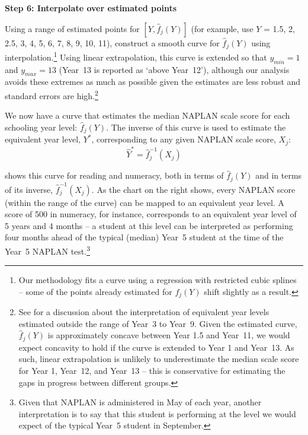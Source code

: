 \vspace{9pt}
\textbf{Step 6: Interpolate over estimated points}
\nopagebreak

Using a range of estimated points for $\left[Y,\widehat{f}_{j}(Y)\right]$ (for example, use $Y$ = 1.5, 2, 2.5, 3, 4, 5, 6, 7, 8, 9, 10, 11), construct a smooth curve for $\widehat{f}_{j}(Y)$ using interpolation.\footnote{Our methodology fits a curve using a regression with restricted cubic splines -- some of the points already estimated for $f_{j}(Y)$ shift slightly as a result.} Using linear extrapolation, this curve is extended so that $y_{min} = 1$ and $y_{max} = 13$ (\mbox{Year 13} is reported as `above \mbox{Year 12}'), although our analysis avoids these extremes as much as possible given the estimates are less robust and standard errors are high.\footnote{See  for a discussion about the interpretation of equivalent year levels estimated outside the range of \mbox{Year 3} to \mbox{Year 9}. Given the estimated curve, $\widehat{f}_{j}(Y)$ is approximately concave between Year 1.5 and \mbox{Year 11}, we would expect concavity to hold if the curve is extended to Year 1 and \mbox{Year 13}. As such, linear extrapolation is unlikely to underestimate the median scale score for Year 1, \mbox{Year 12}, and \mbox{Year 13} -- this is conservative for estimating the gaps in progress between different groups.}

We now have a curve that estimates the median NAPLAN scale score for each schooling year level: $\widehat{f}_{j}(Y)$. The inverse of this curve is used to estimate the equivalent year level, $Y^{*}$, corresponding to any given NAPLAN scale score, $X_{j}$:
\begin{equation} \widehat{Y}^{*} = \widehat{f}_{j}^{-1}(X_{j}) \end{equation}

 shows this curve for reading and numeracy, both in terms of $\widehat{f}_{j}(Y)$ and in terms of its inverse, $\widehat{f}_{j}^{-1}(X_{j})$. As the chart on the right shows, every NAPLAN score (within the range of the curve) can be mapped to an equivalent year level. A score of 500 in numeracy, for instance, corresponds to an equivalent year level of 5 years and 4 months -- a student at this level can be interpreted as performing four months ahead of the typical (median) \mbox{Year 5} student at the time of the \mbox{Year 5} NAPLAN test.\footnote{Given that NAPLAN is administered in May of each year, another interpretation is to say that this student is performing at the level we would expect of the typical \mbox{Year 5} student in September.}

